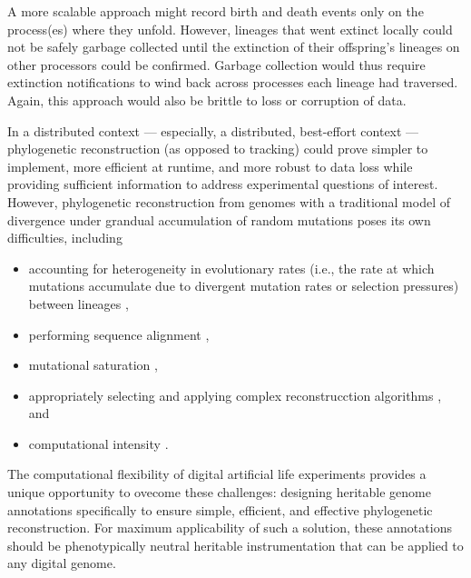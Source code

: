 A more scalable approach might record birth and death events only on the process(es) where they unfold.
However, lineages that went extinct locally could not be safely garbage collected until the extinction of their offspring's lineages on other processors could be confirmed.
Garbage collection would thus require extinction notifications to wind back across processes each lineage had traversed.
Again, this approach would also be brittle to loss or corruption of data.


In a distributed context --- especially, a distributed, best-effort context --- phylogenetic reconstruction (as opposed to tracking) could prove simpler to implement, more efficient at runtime, and more robust to data loss while providing sufficient information to address experimental questions of interest.
However, phylogenetic reconstruction from genomes with a traditional model of divergence under grandual accumulation of random mutations poses its own difficulties, including
\begin{itemize}
\item accounting for heterogeneity in evolutionary rates (i.e., the rate at which mutations accumulate due to divergent mutation rates or selection pressures) between lineages \citep{lack2010identifying},
\item performing sequence alignment \citep{casci2008lining},
\item mutational saturation \citep{hagstrom2004using},
\item appropriately selecting and applying complex reconstrucction algorithms \citep{kapli2020phylogenetic}, and
\item computational intensity \citep{sarkar2010hardware}.
\end{itemize}

The computational flexibility of digital artificial life experiments provides a unique opportunity to ovecome these challenges: designing heritable genome annotations specifically to ensure simple, efficient, and effective phylogenetic reconstruction.
For maximum applicability of such a solution, these annotations should be phenotypically neutral heritable instrumentation \citep{stanley2002evolving} that can be applied to any digital genome.

